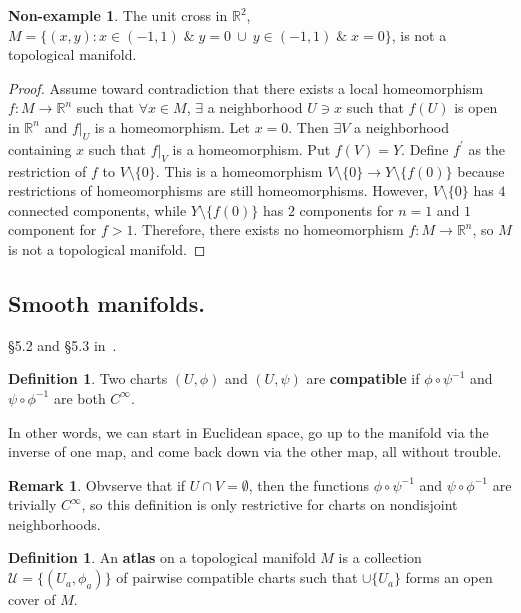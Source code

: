 \documentclass[12pt]{article}
\newcommand{\R}{\mathbb{R}}
\theoremstyle{definition}
\theoremstyle{definition}
\theoremstyle{definition}
\theoremstyle{definition}
\newtheorem{rmk}[them]{Remark}
\theoremstyle{definition}
\newtheorem{defn}[them]{Definition}
\theoremstyle{definition}
\theoremstyle{definition}
\newtheorem{nex}[them]{Non-example}
\theoremstyle{definition}
\begin{document}
\begin{nex} The unit cross in $\R^2$,
    $M = \{(x,y): x \in (-1,1) \; \&  \; y = 0 \:
    \cup \: y \in (-1,1) \; \& \; x = 0\}$, is not a
    topological manifold.
\end{nex}

\begin{proof}Assume toward contradiction that
    there exists a local homeomorphism $f: M \to
    \R^n$ such that $\forall x \in M$, $\exists$ a
    neighborhood $U \ni x$ such that $f(U)$ is
    open in $\R^n$ and $f\big|_U$ is a
    homeomorphism. Let $x = 0$. Then $\exists V$ a
    neighborhood containing $x$ such that
    $f\big|_V$ is a homeomorphism. Put $f(V) = Y$.
    Define $f^\prime$ as the restriction of $f$ to
    $V \setminus \{0\}$. This is a homeomorphism
    $V \setminus \{0\} \to Y \setminus \{f(0)\}$
    because restrictions of homeomorphisms are
    still homeomorphisms. However, $V \setminus
    \{0\}$ has $4$ connected components, while $Y
    \setminus \{f(0)\}$ has $2$ components for $n
    = 1$ and $1$ component for $f > 1$. Therefore,
    there exists no homeomorphism $f: M \to \R^n$,
    so $M$ is not a topological manifold.
\end{proof}

\subsection{Smooth manifolds.}
\par{§5.2 and §5.3 in~\cite{Tu}.}
\begin{defn}
    Two charts $(U, \phi)$ and $(U, \psi)$ are
    \textbf{compatible} if $\phi \circ \psi^{-1}$ and
    $\psi \circ \phi^{-1}$ are both $C^\infty$.
\end{defn}

\par{In other words, we can start in Euclidean
space, go up to the manifold via the inverse of
one map, and come back down via the other map,
all without trouble.}

\begin{rmk}
Obvserve that if $U \cap V =
\emptyset$, then the functions $\phi \circ
\psi^{-1}$ and $\psi \circ \phi^{-1}$ are
trivially $C^\infty$, so this definition is only
restrictive for charts on nondisjoint
neighborhoods.
\end{rmk}

\begin{defn}
An \textbf{atlas} on a topological manifold $M$ is a
collection $\mathcal{U} = \{(U_a, \phi_a)\}$ of
pairwise compatible charts such that $\cup
\{U_a\}$ forms an open cover of $M$.
\end{defn}
\end{document}
